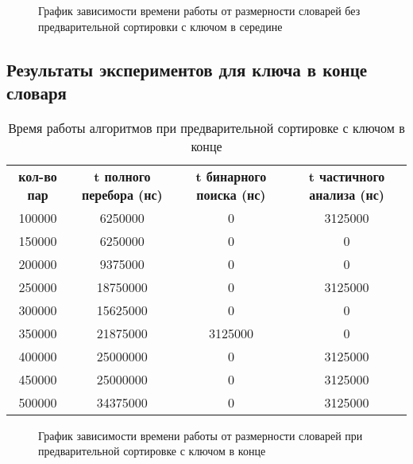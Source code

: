 \begin{figure}[ph!]
	\caption{График зависимости времени работы от размерности словарей без предварительной сортировки с ключом в середине}
\end{figure}

\newpage
\subsection{Результаты экспериментов для ключа в конце словаря}

\begin{table}[ph!]
  \begin{center}
    \captionsetup{justification=raggedright}
     \caption{Время работы алгоритмов при предварительной сортировке с ключом в конце}
    \label{tab:workcost_classic}
    \begin{tabular}{c|c|c|c}
      \textbf{кол-во пар} & \textbf{t полного перебора (нс)}  & \textbf{t бинарного поиска (нс)} & \textbf{t частичного анализа (нс)}\\
	100000 & 6250000 & 0 & 3125000\\
	150000 & 6250000 & 0 & 0\\
	200000 & 9375000 & 0 & 0\\
	250000 & 18750000 & 0 & 3125000\\
	300000 & 15625000 & 0 & 0\\
	350000 & 21875000 & 3125000 & 0\\
	400000 & 25000000 & 0 & 3125000\\
	450000 & 25000000 & 0 & 3125000\\
	500000 & 34375000 & 0 & 3125000\\
      \hline	
    \end{tabular}
  \end{center}
\end{table}

\begin{figure}[ph!]
	\caption{График зависимости времени работы от размерности словарей при предварительной сортировке с ключом в конце}
\end{figure}

